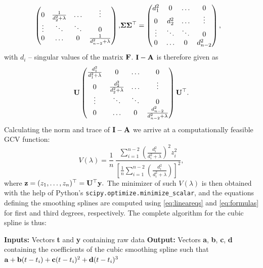 \documentclass[11pt,leqno]{book}
\theoremstyle{definition}
\theoremstyle{plain}
\theoremstyle{definition}
\begin{document}
{\begin{equation*}
\begin{aligned}
\begin{pmatrix}
0 & \frac{1}{d_2^2+\lambda} & \ldots & \vdots \\
\vdots & \ddots & \ddots & 0 \\
0 & \ldots & 0 & \frac{1}{d_{n-2}^2+\lambda}
\end{pmatrix},
&\vb{\Sigma\Sigma^\top}=\begin{pmatrix}
d_1^2&0& \ldots & 0 \\
0 & d_2^2 & \ldots & \vdots \\
\vdots & \ddots & \ddots & 0 \\
0 & \ldots & 0 & d_{n-2}^2
\end{pmatrix},
\end{aligned}
\end{equation*}
with $d_i$ -- singular values of the matrix $\vb{F}$.
\noindent $\vb{I-A}$ is therefore given as
\begin{equation}
\vb{U}\begin{pmatrix}
\frac{d_1^2}{d_1^2+\lambda}&0& \ldots & 0 \\
0 & \frac{d_2^2}{d_2^2+\lambda} & \ldots & \vdots \\
\vdots & \ddots & \ddots & 0 \\
0 & \ldots & 0 & \frac{d^2_{n-2}}{d_{n-2}^2+\lambda}
\end{pmatrix}\vb{U}^\top.
\end{equation}
Calculating the norm and trace of $\vb{I-A}$ we arrive at a computationally feasible GCV function:
\begin{equation*}
V(\lambda)=\frac{1}{n}\,\frac{\displaystyle \sum_{i=1}^{n-2}\left(\frac{d_i^2}{d_i^2+\lambda}\right)^2 {z}_i^2}{\displaystyle \left[\frac{1}{n}\sum_{i=1}^{n-2}\left(\frac{d_i^2}{d_i^2+\lambda}\right)\right]^2},
\end{equation*}
where $\vb{z}=(z_1, \ldots, z_n)^\top=\vb{U^\top y}.$
The minimizer of such $V(\lambda)$ is then obtained with the help of Python's \texttt{scipy.optimize.minimize\_scalar}, and the equations defining the smoothing splines are computed using \eqref{eq:lineareqs} and \eqref{eq:formulas} for first and third degrees, respectively. The complete algorithm for the cubic spline is thus:
\begin{algorithm}[H]
\caption{Cubic smoothing spline computation}
\begin{algorithmic}[1]
\State \textbf{Inputs:} Vectors \textbf{t} and \textbf{y} containing raw data 
\State \textbf{Output:} Vectors \textbf{a}, \textbf{b}, \textbf{c}, \textbf{d} containing the coefficients of the cubic smoothing spline such that $\vb{a}+\vb{b}(t-t_i)+\vb{c}(t-t_i)^2+\vb{d}(t-t_i)^3$

\end{algorithmic}
\end{algorithm}}
\end{document}
